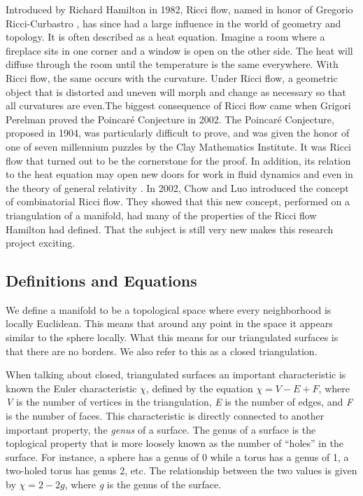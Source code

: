 \documentclass[12pt]{article}
\begin{document}
Introduced by Richard Hamilton in 1982, Ricci flow, named in honor of Gregorio Ricci-Curbastro \cite{RicciBkgd}, has since had a large influence in the world of geometry and topology. It is often described as a heat equation. Imagine a room where a fireplace sits in one corner and a window is open on the other side. The heat will diffuse through the room until the temperature is the same everywhere. With Ricci flow, the same occurs with the curvature. Under Ricci flow, a geometric object that is distorted and uneven will morph and change as necessary so that all curvatures are even.The biggest consequence of Ricci flow came when Grigori Perelman proved the Poincar\'{e} Conjecture in 2002. The Poincar\'{e} Conjecture, proposed in 1904, was particularly difficult to prove, and was given the honor of one of seven millennium puzzles by the Clay Mathematics Institute. It was Ricci flow that turned out to be the cornerstone for the proof. In addition, its relation to the heat equation may open new doors for work in fluid dynamics and even in the theory of general relativity \cite{RicciBkgd}. In 2002, Chow and Luo introduced the concept of combinatorial Ricci flow. They showed that this new concept, performed on a triangulation of a manifold, had many of the properties of the Ricci flow Hamilton had defined. That the subject is still very new makes this research project exciting. \newline

\subsection{Definitions and Equations}
We define a manifold to be a topological space where every neighborhood is locally Euclidean. This means that around any point in the space it appears similar to the sphere locally. What this means for our triangulated surfaces is that there are no borders. We also refer to this as a closed triangulation.\newline

\noindent When talking about closed, triangulated surfaces an important characteristic is known the Euler characteristic $\chi$, defined by the equation $\chi = V - E + F$, where \textit{V} is the number of vertices in the triangulation, \textit{E} is the number of edges, and \textit{F} is the number of faces. This characteristic is directly connected to another important property, the \textit{genus} of a surface. The genus of a surface is the toplogical property that is more loosely known as the number of ``holes'' in the surface. For instance, a sphere has a genus of 0 while a torus has a genus of 1, a two-holed torus has genus 2, etc. The relationship between the two values is given by $\chi = 2 - 2g$, where \textit{g} is the genus of the surface.\newline 
\end{document}
